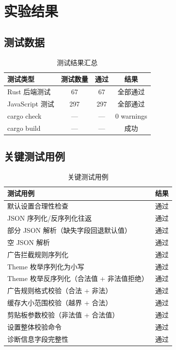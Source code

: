 \documentclass[12pt,a4paper]{ctexart}
\begin{document}
\section{实验结果}

\subsection{测试数据}

\begin{table}[H]
\centering
\begin{tabular}{lccc}
\toprule
测试类型 & 测试数量 & 通过 & 结果 \\
\midrule
Rust 后端测试 & 67 & 67 & 全部通过 \\
JavaScript 测试 & 297 & 297 & 全部通过 \\
cargo check & --- & --- & 0 warnings \\
cargo build & --- & --- & 成功 \\
\bottomrule
\end{tabular}
\caption{测试结果汇总}
\end{table}

\subsection{关键测试用例}

\begin{table}[H]
\centering
\begin{tabular}{p{5cm}l}
\toprule
测试用例 & 结果 \\
\midrule
默认设置合理性检查 & 通过 \\
JSON 序列化/反序列化往返 & 通过 \\
部分 JSON 解析（缺失字段回退默认值） & 通过 \\
空 JSON 解析 & 通过 \\
广告拦截规则序列化 & 通过 \\
Theme 枚举序列化为小写 & 通过 \\
Theme 枚举反序列化（合法值 + 非法值拒绝） & 通过 \\
广告规则格式校验（合法 + 非法） & 通过 \\
缓存大小范围校验（越界 + 合法） & 通过 \\
剪贴板参数校验（非法值 + 合法值） & 通过 \\
设置整体校验命令 & 通过 \\
诊断信息字段完整性 & 通过 \\
\bottomrule
\end{tabular}
\caption{关键测试用例}
\end{table}
\end{document}
